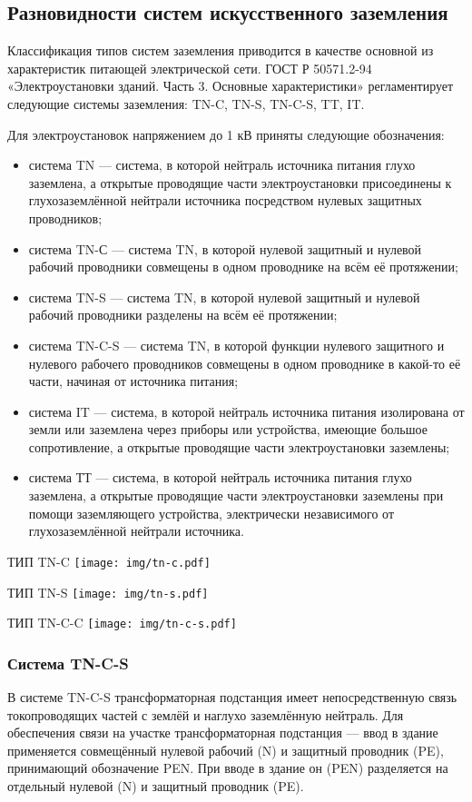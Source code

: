 \documentclass[10pt, twocolumn]{report}
\begin{document}
\subsection{Разновидности систем искусственного заземления}

Классификация типов систем заземления приводится в качестве основной из характеристик питающей электрической сети. ГОСТ Р 50571.2-94 «Электроустановки зданий. Часть 3. Основные характеристики» регламентирует следующие системы заземления: TN-C, TN-S, TN-C-S, TT, IT.

Для электроустановок напряжением до 1 кВ приняты следующие обозначения:

\begin{itemize}
\item система TN — система, в которой нейтраль источника питания глухо заземлена, а открытые проводящие части электроустановки присоединены к глухозаземлённой нейтрали источника посредством нулевых защитных проводников;
\item система TN-С — система TN, в которой нулевой защитный и нулевой рабочий проводники совмещены в одном проводнике на всём её протяжении;
\item система TN-S — система TN, в которой нулевой защитный и нулевой рабочий проводники разделены на всём её протяжении;
\item система TN-C-S — система TN, в которой функции нулевого защитного и нулевого рабочего проводников совмещены в одном проводнике в какой-то её части, начиная от источника питания;
\item система IT — система, в которой нейтраль источника питания изолирована от земли или заземлена через приборы или устройства, имеющие большое сопротивление, а открытые проводящие части электроустановки заземлены;
\item система ТТ — система, в которой нейтраль источника питания глухо заземлена, а открытые проводящие части электроустановки заземлены при помощи заземляющего устройства, электрически независимого от глухозаземлённой нейтрали источника.
\end{itemize}

ТИП TN-C
\texttt{[image: img/tn-c.pdf]}

ТИП TN-S
\texttt{[image: img/tn-s.pdf]} 

ТИП TN-C-C
\texttt{[image: img/tn-c-s.pdf]} 

\subsubsection{Система TN-C-S}
В системе TN-C-S трансформаторная подстанция имеет непосредственную связь токопроводящих частей с землёй и наглухо заземлённую нейтраль. Для обеспечения связи на участке трансформаторная подстанция — ввод в здание применяется совмещённый нулевой рабочий (N) и защитный проводник (PE), принимающий обозначение PEN. При вводе в здание он (PEN) разделяется на отдельный нулевой (N) и защитный проводник (PE).
\end{document}
